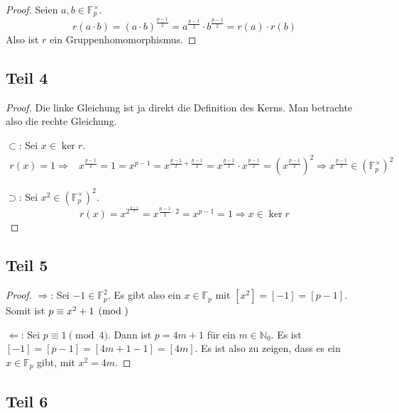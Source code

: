 \documentclass[10pt,a4paper]{article}
\begin{document}
\begin{proof}


  Seien $a, b \in \mathbb{F}_{p}^{\times}$.
  \begin{equation}
    r(a \cdot b) = (a \cdot b)^{\frac{p - 1}{2}} = a^{\frac{p - 1}{2}} \cdot b^{\frac{p - 1}{2}} = r(a) \cdot r(b)
  \end{equation}
  Also ist $r$ ein Gruppenhomomorphismus.
\end{proof}

\subsection{Teil 4}

\begin{proof}
  Die linke Gleichung ist ja direkt die Definition des Kerns.
  Man betrachte also die rechte Gleichung.

  $\subset$: Sei $x \in \ker r$.
  \begin{align*}
    r(x) = 1 \Rightarrow & x^{\frac{p - 1}{2}} = 1 = x^{p - 1} = x^{\frac{p - 1}{2} + \frac{p - 1}{2}} = x^{\frac{p - 1}{2}} \cdot x^{\frac{p - 1}{2}} = (x^{\frac{p - 1}{2}})^{2} \Rightarrow x^{\frac{p - 1}{2}} \in (\mathbb{F}_{p}^{\times})^{2}
  \end{align*}

  $\supset$: Sei $x^{2} \in (\mathbb{F}_{p}^{\times})^{2}$.
  \begin{equation}
    r(x) = x^{2}^{\frac{p - 1}{2}} = x^{\frac{p - 1}{2} \cdot 2} = x^{p - 1} = 1 \Rightarrow x \in \ker r
  \end{equation}
\end{proof}

\subsection{Teil 5}

\begin{proof}
  $\Rightarrow$: Sei $-1 \in \mathbb{F}_{p}^{2}$.
  Es gibt also ein $x \in \mathbb{F}_{p}$ mit $[x^{2}] = [-1] = [p - 1]$.
  Somit ist $p \equiv x^{2} + 1 \pmod $

  $\Leftarrow$: Sei $p \equiv 1 \pmod 4$.
  Dann ist $p = 4m + 1$ für ein $m \in \mathbb{N}_{0}$.
  Es ist $[-1] = [p - 1] = [4m + 1 - 1] = [4m]$.
  Es ist also zu zeigen, dass es ein $x \in \mathbb{F}_{p}$ gibt, mit $x^{2} = 4m$.
\end{proof}

\subsection{Teil 6}
\end{document}
